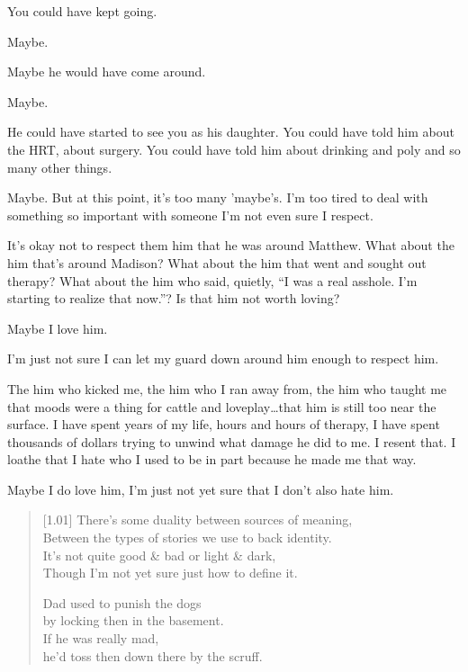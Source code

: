 \begin{paracol}{2}
\begin{leftcolumn}
\begin{ally}
You could have kept going.
\end{ally}
Maybe.

\begin{ally}
Maybe he would have come around.
\end{ally}
Maybe.

\begin{ally}
He could have started to see you as his daughter. You could have told him about the HRT, about surgery. You could have told him about drinking and poly and so many other things.
\end{ally}
Maybe. But at this point, it's too many 'maybe's. I'm too tired to deal with something so important with someone I'm not even sure I respect.

\begin{ally}
It's okay not to respect them him that he was around Matthew. What about the him that's around Madison? What about the him that went and sought out therapy? What about the him who said, quietly, ``I was a real asshole. I'm starting to realize that now.''? Is that him not worth loving?
\end{ally}
Maybe I love him.

I'm just not sure I can let my guard down around him enough to respect him.

The him who kicked me, the him who I ran away from, the him who taught me that moods were a thing for cattle and loveplay\ldots{}that him is still too near the surface. I have spent years of my life, hours and hours of therapy, I have spent thousands of dollars trying to unwind what damage he did to me. I resent that. I loathe that I hate who I used to be in part because he made me that way.

Maybe I do love him, I'm just not yet sure that I don't also hate him.
\newpage

\begin{verse}[1.01\textwidth]
  There's some duality between sources of meaning,\\
  \vin Between the types of stories we use to back identity.\\
  It's not quite good \& bad or light \& dark,\\
  \vin Though I'm not yet sure just how to define it.

  Dad used to punish the dogs\\
  \vin by locking then in the basement.\\
  If he was really mad,\\
  \vin he'd toss then down there by the scruff.


\end{verse}
\end{leftcolumn}
\end{paracol}
